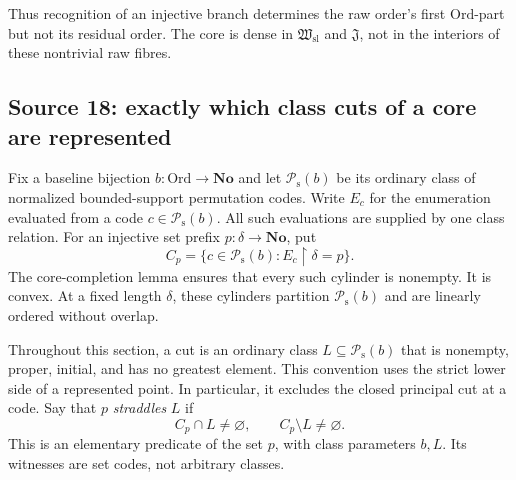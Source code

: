 \documentclass[11pt]{article}
\theoremstyle{definition}
\theoremstyle{remark}
\newcommand{\No}{\mathbf{No}}
\newcommand{\Ord}{\mathrm{Ord}}
\newcommand{\Hsl}{\mathfrak W_{\mathrm{sl}}}
\newcommand{\Jinj}{\mathfrak J}
\newcommand{\Psupp}{\mathcal P_{\mathrm{s}}}
\begin{document}
Thus recognition of an injective branch determines the raw order's first
$\Ord$-part but not its residual order. The core is dense in $\Hsl$ and
$\Jinj$, not in the interiors of these nontrivial raw fibres.

\subsection{Source 18: exactly which class cuts of a core are represented}
\label{swo:sh:sec:represented-class-cuts}

Fix a baseline bijection $b:\Ord\to\No$ and let
$\Psupp(b)$ be its ordinary class of normalized bounded-support
permutation codes.  Write $E_c$ for the enumeration evaluated from a
code $c\in\Psupp(b)$.  All such evaluations are supplied by one
class relation.  For an injective set prefix $p:\delta\to\No$,
put
\[
 C_{p}=\{c\in\Psupp(b):E_c\restriction\delta=p\}.
\]
The core-completion lemma ensures that every such cylinder is
nonempty.  It is convex.  At a fixed length $\delta$, these cylinders
partition $\Psupp(b)$ and are linearly ordered without overlap.

Throughout this section, a cut is an ordinary class
$L\subseteq\Psupp(b)$ that is nonempty, proper, initial, and has
no greatest element.  This convention uses the strict lower side of
a represented point.  In particular, it excludes the closed principal
cut at a code.  Say that $p$ \emph{straddles} $L$ if
\[
 C_{p}\cap L\ne\varnothing,
 \qquad
 C_{p}\setminus L\ne\varnothing.
\]
This is an elementary predicate of the set $p$, with class parameters
$b,L$.  Its witnesses are set codes, not arbitrary classes.
\end{document}
